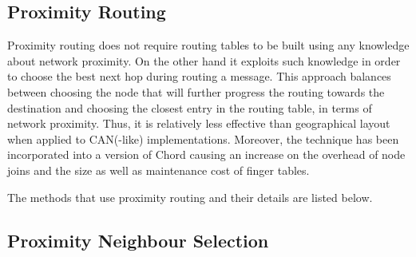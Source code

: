 \subsection{Proximity Routing}

Proximity routing does not require routing tables to be built using any
knowledge about network proximity. On the other hand it exploits such knowledge
in order to choose the best next hop during routing a message. This approach
balances between choosing the node that will further progress the routing
towards the destination and choosing the closest entry in the routing table, in
terms of network proximity.
Thus, it is relatively less effective than
geographical layout when applied to CAN(-like) implementations. Moreover, the
technique has been incorporated into a version of Chord causing an increase on
the overhead of node joins and the size as well as maintenance cost of finger
tables.


%
%
The methods that use proximity routing and their details are listed below.





\subsection{Proximity Neighbour Selection}

